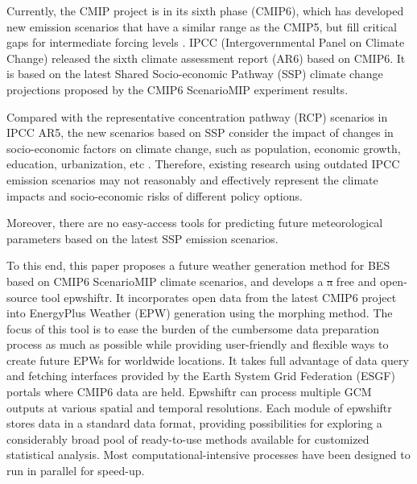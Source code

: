 \documentclass[twocolumn, a4paper,10pt]{article}
\makeatletter
\renewcommand\section{\@startsection{section}{1}{\z@}{3pt}{3pt}{\normalfont\large\bfseries}}
\providecommand{\DIFdeltex}[1]{{\protect\color{red}\sout{#1}}}                      %
\providecommand{\DIFdelbegin}{} %
\providecommand{\DIFdelend}{} %
\providecommand{\DIFdel}[1]{\texorpdfstring{\DIFdeltex{#1}}{}} %
\newcommand{\DIFscaledelfig}{0.5}
\newlength{\DIFdelgraphicswidth} %
\newlength{\DIFdelgraphicsheight} %
\newcommand{\DIFdelincludegraphics}[2][]{%
\sbox{\DIFdelgraphicsbox}{\DIFOincludegraphics[#1]{#2}}%
\settoboxwidth{\DIFdelgraphicswidth}{\DIFdelgraphicsbox} %
\settoboxtotalheight{\DIFdelgraphicsheight}{\DIFdelgraphicsbox} %
\scalebox{\DIFscaledelfig}{%
\parbox[b]{\DIFdelgraphicswidth}{\usebox{\DIFdelgraphicsbox}\\[-\baselineskip] \rule{\DIFdelgraphicswidth}{0em}}\llap{\resizebox{\DIFdelgraphicswidth}{\DIFdelgraphicsheight}{%
\setlength{\unitlength}{\DIFdelgraphicswidth}%
\begin{picture}(1,1)%
\thicklines\linethickness{2pt} %
{\color[rgb]{1,0,0}\put(0,0){\framebox(1,1){}}}%
{\color[rgb]{1,0,0}\put(0,0){\line( 1,1){1}}}%
{\color[rgb]{1,0,0}\put(0,1){\line(1,-1){1}}}%
\end{picture}%
}\hspace*{3pt}}} %
} %
\DeclareRobustCommand{\DIFdelbegin}{\DIFOdelbegin \let\includegraphics\DIFdelincludegraphics} %
\DeclareRobustCommand{\DIFdelend}{\DIFOaddend \let\includegraphics\DIFOincludegraphics} %
\makeatother
\begin{document}
Currently, the CMIP project is in its sixth phase (CMIP6), which has developed
new emission scenarios that have a similar range as the CMIP5, but fill critical
gaps for intermediate forcing levels \citep{oneill2016scenario}. IPCC
(Intergovernmental Panel on Climate Change) released the sixth climate
assessment report (AR6) based on CMIP6. It is based on the latest Shared
Socio-economic Pathway (SSP) climate change projections proposed by the CMIP6
ScenarioMIP experiment results.

Compared with the representative concentration pathway (RCP) scenarios in IPCC
AR5, the new scenarios based on SSP consider the impact of changes in
socio-economic factors on climate change, such as population, economic growth,
education, urbanization, etc \citep{chakraborty2021scenariobased}. Therefore,
existing research using outdated IPCC emission scenarios may not reasonably and
effectively represent the climate impacts and socio-economic risks of different
policy options.

Moreover, there are no easy-access tools for predicting future meteorological
parameters based on the latest SSP emission scenarios.

To this end, this paper proposes a future weather generation method for BES
based on CMIP6 ScenarioMIP climate scenarios, and develops a \DIFdelbegin \DIFdel{a }\DIFdelend free and
open-source tool epwshiftr. It incorporates open data from the latest CMIP6
project into EnergyPlus Weather (EPW) generation using the morphing method. The
focus of this tool is to ease the burden of the cumbersome data preparation
process as much as possible while providing user-friendly and flexible ways to
create future EPWs for worldwide locations. It takes full advantage of data
query and fetching interfaces provided by the Earth System Grid Federation (ESGF)
portals where CMIP6 data are held. Epwshiftr can process multiple GCM outputs at
various spatial and temporal resolutions. Each module of epwshiftr stores data
in a standard data format, providing possibilities for exploring a considerably
broad pool of ready-to-use methods available for customized statistical
analysis. Most computational-intensive processes have been designed to run in
parallel for speed-up.

\hypertarget{climate-scenarios-in-cmip6-scenariomip}{%
\section{Climate scenarios in CMIP6 ScenarioMIP}\label{climate-scenarios-in-cmip6-scenariomip}}
\end{document}
